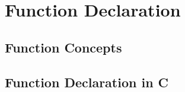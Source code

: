 \chapter{Function Declaration} %
\label{cha:function_declaration}

\minitoc


\section{Function Concepts} %
\label{sec:function_concepts}







\clearpage
\section{Function Declaration in C} %
\label{sec:function_declaration_in_c}










